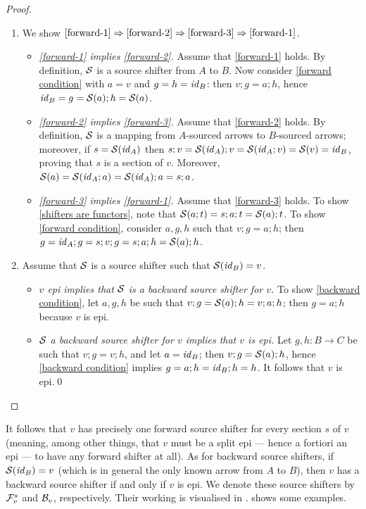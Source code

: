 \begin{fullorname}
\begin{proof}
\begin{enumerate}[topsep=\smallskipamount]
\item
We show $\ref{forward-1} \Rightarrow \ref{forward-2} \Rightarrow \ref{forward-3} \Rightarrow \ref{forward-1}$.
\begin{itemize}
\item \emph{\ref{forward-1} implies \ref{forward-2}.}
%
Assume that \ref{forward-1} holds. By definition, $\mathcal{S}$ is a source shifter from $A$ to $B$. Now consider \eqref{forward condition} with $a=v$ and $g=h=\mathit{id}_B$: then $v;g=a;h$, hence $\mathit{id}_B=g = \mathcal{S}(a);h=\mathcal{S}(a)$.

\item \emph{\ref{forward-2} implies \ref{forward-3}.}
%
Assume that \ref{forward-2} holds. By definition, $\mathcal{S}$ is a mapping from $A$-sourced arrows to $B$-sourced arrows; moreover, if $s=\mathcal{S}(\mathit{id}_A)$ then $s;v=\mathcal{S}(\mathit{id}_A);v=\mathcal{S}(\mathit{id}_A;v)=\mathcal{S}(v)=\mathit{id}_B$, proving that $s$ is a section of $v$. Moreover, $\mathcal{S}(a)=\mathcal{S}(\mathit{id}_A;a)=\mathcal{S}(\mathit{id}_A);a=s;a$.

\item \emph{\ref{forward-3} implies \ref{forward-1}.}
%
Assume that \ref{forward-3} holds. To show \eqref{shifters are functors}, note that $\mathcal{S}(a;t)=s;a;t=\mathcal{S}(a);t$. To show \eqref{forward condition}, consider $a,g,h$ such that $v;g=a;h$; then $g=\mathit{id}_A;g=s;v;g=s;a;h = \mathcal{S}(a);h$.
\end{itemize}

\item Assume that $\mathcal{S}$ is a source shifter such that $\mathcal{S}(\mathit{id}_B)=v$.
\begin{itemize}
\item \emph{$v$ epi implies that $\mathcal{S}$ is a backward source shifter for $v$.} To show \eqref{backward condition}, let $a,g,h$ be such that $v;g=\mathcal{S}(a);h=v;a;h$; then $g=a;h$ because $v$ is epi.

\item \emph{$\mathcal{S}$ a backward source shifter for $v$ implies that $v$ is epi.} Let $g,h:B\to C$ be such that $v;g=v;h$, and let $a=\mathit{id}_B$; then $v;g=\mathcal{S}(a);h$, hence \eqref{backward condition} implies $g=a;h=\mathit{id}_B;h=h$. It follows that $v$ is epi.\qed
\end{itemize}
\end{enumerate}
\end{proof}
\end{fullorname}
%
It follows that $v$ has precisely one forward source shifter for every section $s$ of $v$ (meaning, among other things, that $v$ must be a split epi --- hence a fortiori an epi --- to have any forward shifter at all). As for backward source shifters, if $\mathcal{S}(\mathit{id}_B)=v$ (which is in general the only known arrow from $A$ to $B$), then $v$ has a backward source shifter if and only if $v$ is epi. We denote these source shifters by $\mathcal{F}_v^s$ and $\mathcal{B}_v$, respectively. Their working is visualised in .  shows some examples.

